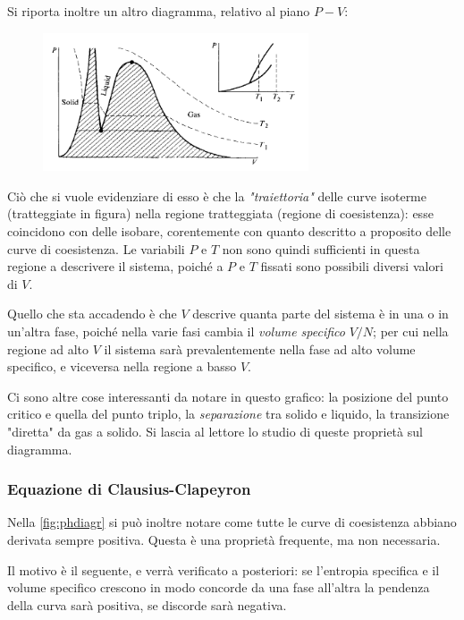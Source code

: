 Si riporta inoltre un altro diagramma, relativo al piano $P-V$:

\begin{figure}[H]
	\centering
	\includegraphics[width=0.7\textwidth]{Immagini/PhasePV.png}
	\caption{}
	\label{fig:phasepv}
\end{figure}

Ciò che si vuole evidenziare di esso è che la \textit{"traiettoria"} delle curve isoterme (tratteggiate in figura) nella regione tratteggiata (regione di coesistenza): esse coincidono con delle isobare, corentemente con quanto descritto a proposito delle curve di coesistenza.
Le variabili $P$ e $T$ non sono quindi sufficienti in questa regione a descrivere il sistema, poiché a $P$ e $T$ fissati sono possibili diversi valori di $V$.

Quello che sta accadendo è che $V$ descrive quanta parte del sistema è in una o in un'altra fase, poiché nella varie fasi cambia il \textit{volume specifico} $V/N$; per cui nella regione ad alto $V$ il sistema sarà prevalentemente nella fase ad alto volume specifico, e viceversa nella regione a basso $V$.

Ci sono altre cose interessanti da notare in questo grafico: la posizione del punto critico e quella del punto triplo, la \textit{separazione} tra solido e liquido, la transizione "diretta" da gas a solido. Si lascia al lettore lo studio di queste proprietà sul diagramma.

\subsubsection{Equazione di Clausius-Clapeyron}

Nella \cref{fig:phdiagr} si può inoltre notare come tutte le curve di coesistenza abbiano derivata sempre positiva. Questa è una proprietà frequente, ma non necessaria.

Il motivo è il seguente, e verrà verificato a posteriori: se l'entropia specifica e il volume specifico crescono in modo concorde da una fase all'altra la pendenza della curva sarà positiva, se discorde sarà negativa.

